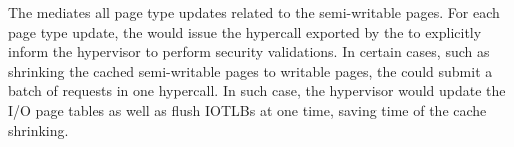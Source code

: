 The \cache mediates all page type updates related to the semi-writable pages.
For each page type update, the \cache would issue the hypercall exported by the \module to explicitly inform the hypervisor to perform security validations.
In certain cases, such as shrinking the cached semi-writable pages to writable pages, the \cache could submit a batch of requests in one hypercall.
In such case, the hypervisor would update the I/O page tables as well as flush IOTLBs at one time, saving time of the cache shrinking.







